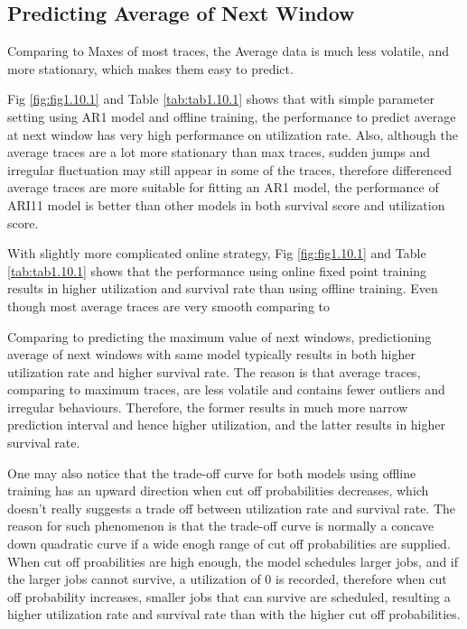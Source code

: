 \documentclass{article}
\begin{document}
\subsection{Predicting Average of Next Window}

\begin{flushleft}
Comparing to Maxes of most traces, the Average data is much less volatile, and
more stationary, which makes them easy to predict.

Fig \ref{fig:fig1.10.1} and Table \ref{tab:tab1.10.1} shows that with simple
parameter setting using AR1 model and offline training, the performance to
predict average at next window has very high performance on utilization rate.
Also, although the average traces are a lot more stationary than max traces,
sudden jumps and irregular fluctuation may still appear in some of the traces,
therefore differenced average traces are more suitable for fitting an AR1 model,
the performance of ARI11 model is better than other models in both survival
score and utilization score.

With slightly more complicated online strategy, Fig \ref{fig:fig1.10.1} and
Table \ref{tab:tab1.10.1} shows that the performance using online fixed point
training results in higher utilization and survival rate than using offline
training. Even though most average traces are very smooth comparing to 

Comparing to predicting the maximum value of next windows,
predictioning average of next windows with same model typically results in both
higher utilization rate and higher survival rate. The reason is that average
traces, comparing to maximum traces, are less volatile and contains fewer
outliers and irregular behaviours. Therefore, the former results in much more
narrow prediction interval and hence higher utilization, and the latter results
in higher survival rate. 

One may also notice that the trade-off curve for both models using offline
training has an upward direction when cut off probabilities decreases, which
doesn't really suggests a trade off between utilization rate and survival rate.
The reason for such phenomenon is that the trade-off curve is normally a concave
down quadratic curve if a wide enogh range of cut off probabilities are
supplied. When cut off proabilities are high enough, the model schedules larger
jobs, and if the larger jobs cannot survive, a utilization of $0$ is recorded,
therefore when cut off probability increases, smaller jobs that can survive are
scheduled, resulting a higher utilization rate and survival rate than with the
higher cut off probabilities.
\end{flushleft}
\end{document}

